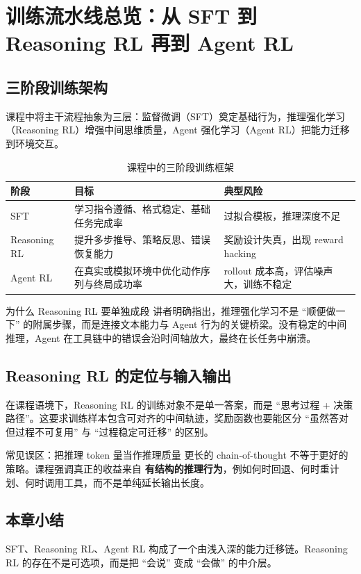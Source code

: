 \section{训练流水线总览：从 SFT 到 Reasoning RL 再到 Agent RL}

\subsection{三阶段训练架构}
课程中将主干流程抽象为三层：监督微调（SFT）奠定基础行为，推理强化学习（Reasoning RL）增强中间思维质量，Agent 强化学习（Agent RL）把能力迁移到环境交互。

\begin{table}[H]
\centering
\begin{tabular}{p{2.7cm}p{4.5cm}p{4.7cm}}
\toprule
\textbf{阶段} & \textbf{目标} & \textbf{典型风险} \\
\midrule
SFT & 学习指令遵循、格式稳定、基础任务完成率 & 过拟合模板，推理深度不足 \\
Reasoning RL & 提升多步推导、策略反思、错误恢复能力 & 奖励设计失真，出现 reward hacking \\
Agent RL & 在真实或模拟环境中优化动作序列与终局成功率 & rollout 成本高，评估噪声大，训练不稳定 \\
\bottomrule
\end{tabular}
\caption{课程中的三阶段训练框架}
\end{table}

\begin{importantbox}{为什么 Reasoning RL 要单独成段}
讲者明确指出，推理强化学习不是 ``顺便做一下'' 的附属步骤，而是连接文本能力与 Agent 行为的关键桥梁。没有稳定的中间推理，Agent 在工具链中的错误会沿时间轴放大，最终在长任务中崩溃。
\end{importantbox}

\subsection{Reasoning RL 的定位与输入输出}
在课程语境下，Reasoning RL 的训练对象不是单一答案，而是 ``思考过程 + 决策路径''。这要求训练样本包含可对齐的中间轨迹，奖励函数也要能区分 ``虽然答对但过程不可复用'' 与 ``过程稳定可迁移'' 的区别。

\begin{warningbox}{常见误区：把推理 token 量当作推理质量}
更长的 chain-of-thought 不等于更好的策略。课程强调真正的收益来自 \textbf{有结构的推理行为}，例如何时回退、何时重计划、何时调用工具，而不是单纯延长输出长度。
\end{warningbox}

\subsection{本章小结}
SFT、Reasoning RL、Agent RL 构成了一个由浅入深的能力迁移链。Reasoning RL 的存在不是可选项，而是把 ``会说'' 变成 ``会做'' 的中介层。


